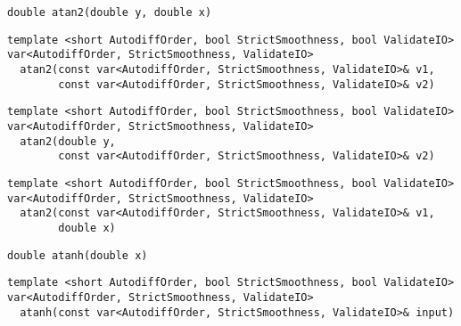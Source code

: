 \begin{tcolorbox}[colback=white,colframe=gray90, coltitle=black,boxrule=3pt,
fonttitle=\bfseries,title= Atan2]

\begin{verbatim}
double atan2(double y, double x)

\end{verbatim}

\begin{verbatim}
template <short AutodiffOrder, bool StrictSmoothness, bool ValidateIO>
var<AutodiffOrder, StrictSmoothness, ValidateIO>
  atan2(const var<AutodiffOrder, StrictSmoothness, ValidateIO>& v1,
        const var<AutodiffOrder, StrictSmoothness, ValidateIO>& v2)

\end{verbatim}

\begin{verbatim}
template <short AutodiffOrder, bool StrictSmoothness, bool ValidateIO>
var<AutodiffOrder, StrictSmoothness, ValidateIO>
  atan2(double y,
        const var<AutodiffOrder, StrictSmoothness, ValidateIO>& v2)

\end{verbatim}

\begin{verbatim}
template <short AutodiffOrder, bool StrictSmoothness, bool ValidateIO>
var<AutodiffOrder, StrictSmoothness, ValidateIO>
  atan2(const var<AutodiffOrder, StrictSmoothness, ValidateIO>& v1,
        double x)

\end{verbatim}

\end{tcolorbox}

\begin{tcolorbox}[colback=white,colframe=gray90, coltitle=black,boxrule=3pt,
fonttitle=\bfseries,title= Atanh]

\begin{verbatim}
double atanh(double x)

\end{verbatim}

\begin{verbatim}
template <short AutodiffOrder, bool StrictSmoothness, bool ValidateIO>
var<AutodiffOrder, StrictSmoothness, ValidateIO>
  atanh(const var<AutodiffOrder, StrictSmoothness, ValidateIO>& input)

\end{verbatim}

\end{tcolorbox}

